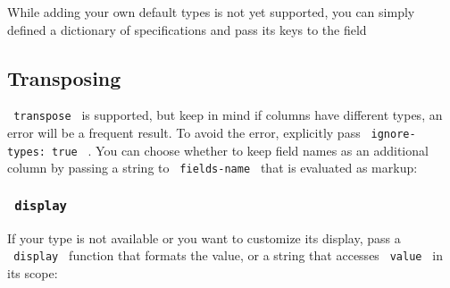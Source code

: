 While adding your own default types is not yet supported, you can simply
defined a dictionary of specifications and pass its keys to the field

\begin{Shaded}
\begin{Highlighting}[]
\NormalTok{)}
\end{Highlighting}
\end{Shaded}


\subsection{Transposing}\label{transposing}

\texttt{\ transpose\ } is supported, but keep in mind if columns have
different types, an error will be a frequent result. To avoid the error,
explicitly pass \texttt{\ ignore-types:\ true\ } . You can choose
whether to keep field names as an additional column by passing a string
to \texttt{\ fields-name\ } that is evaluated as markup:

\begin{Shaded}
\begin{Highlighting}[]
\NormalTok{  )}
\NormalTok{)}
\end{Highlighting}
\end{Shaded}


\subsubsection{\texorpdfstring{\texttt{\ display\ }}{ display }}\label{display}

If your type is not available or you want to customize its display, pass
a \texttt{\ display\ } function that formats the value, or a string that
accesses \texttt{\ value\ } in its scope:

